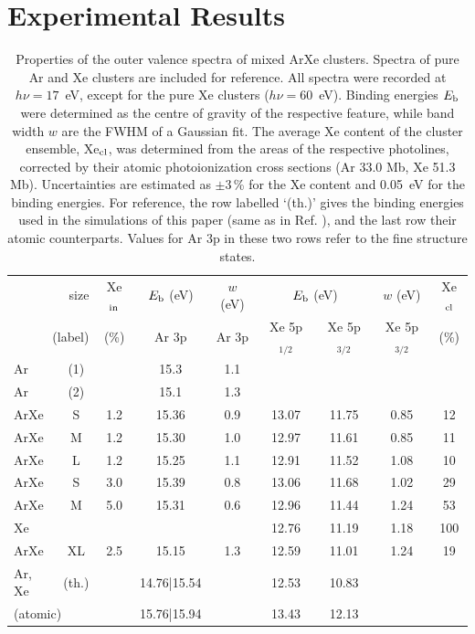 \section{Experimental Results
\label{sec:exp_results}}
%
%
\begin{table}
\caption{Properties of the outer valence spectra of mixed ArXe clusters. 
Spectra of pure Ar and Xe clusters are included for reference. 
All spectra were recorded at $h\nu = 17$~eV, except for the pure Xe clusters ($h\nu = 60$~eV). 
Binding energies $E_{\rm b}$ were determined as the centre of gravity of the respective feature, while band width $w$ are the FWHM of a Gaussian fit. 
The average Xe content of the cluster ensemble, Xe$_{\rm cl}$, was determined from the areas of the respective photolines, corrected by their atomic photoionization cross sections (Ar 33.0 Mb, Xe 51.3 Mb)\cite{samson2002}.
Uncertainties are estimated as $\pm$3\,\% for the Xe content and 0.05~eV for the binding energies. 
For reference, the row labelled `(th.)' gives the binding energies used in the simulations of this paper (same as in Ref. \cite{Fasshauer13}), and the last row their atomic counterparts. 
Values for Ar 3p in these two rows refer to the fine structure states.
\label{tab:valence} }
\begin{tabular}{ l c c c c c c c c}
%
\toprule
 \multicolumn{2}{r}{size} &  Xe$_{\rm in}$& $E_{\rm b}$ (eV)& $w$ (eV)& \multicolumn{2}{c}{$E_{\rm b}$ (eV)}  & $w$ (eV) &  Xe$_{\rm cl}$ \\
%
 \multicolumn{2}{r}{(label)}&  (\%) & Ar 3p & Ar 3p & Xe 5p$_{1/2}$ &  Xe 5p$_{3/2}$ & Xe 5p$_{3/2}$  &  (\%) \\
\midrule
 Ar & (1) &&  15.3  &  1.1 & & & &  \\
 Ar & (2) &&  15.1  &  1.3 & & & &  \\
%
 ArXe & S &1.2 & 15.36 & 0.9 & 13.07 & 11.75 & 0.85 & 12\\
 ArXe & M &1.2 & 15.30 & 1.0 & 12.97 & 11.61 & 0.85 & 11\\
 ArXe & L &1.2 & 15.25 & 1.1 & 12.91 & 11.52 & 1.08 & 10\\
 ArXe & S &3.0 & 15.39 & 0.8 & 13.06 & 11.68 & 1.02 & 29\\
 ArXe & M &5.0 & 15.31 & 0.6 & 12.96 & 11.44 & 1.24 & 53\\
 Xe &  & & & & 12.76 & 11.19 & 1.18 & 100\\
%
\midrule
%
 ArXe & XL &2.5 & 15.15 & 1.3 & 12.59 & 11.01 & 1.24 & 19\\
%
\midrule
%
 Ar, Xe & (th.) && 14.76|15.54 && 12.53 & 10.83 &&\\
%
 \multicolumn{2}{l}{(atomic)\cite{velchev,sansonetti}} && 15.76|15.94 && 13.43 & 12.13 &&\\
%
\bottomrule
\end{tabular}
\end{table}

